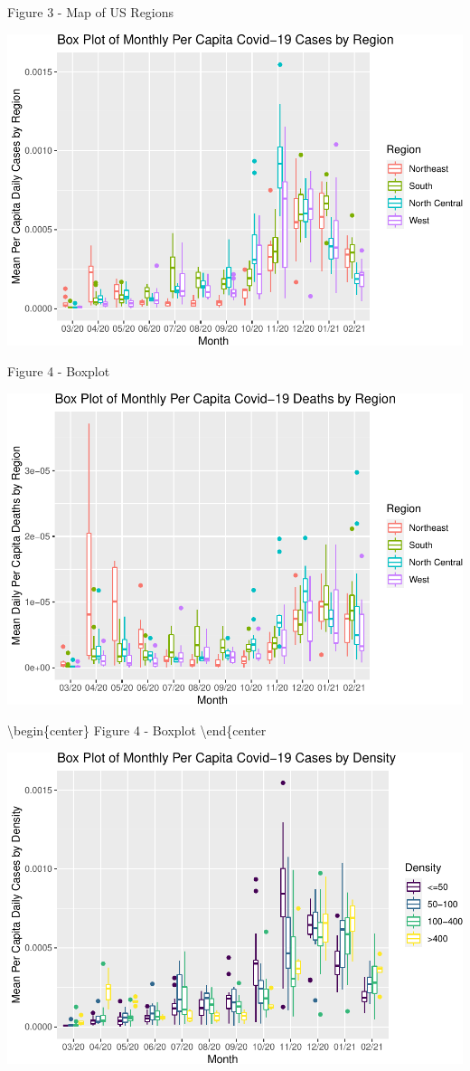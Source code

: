 \documentclass[11pt,]{article}
\begin{document}
\begin{center}
Figure 3 - Map of US Regions
\end{center}

\includegraphics{figs/unnamed-chunk-7.pdf}

\begin{center}
Figure 4 - Boxplot
\end{center}

\includegraphics{figs/unnamed-chunk-8.pdf}

\textbackslash begin\{center\} Figure 4 - Boxplot
\textbackslash end\{center

\includegraphics{figs/unnamed-chunk-9.pdf}
\end{document}
